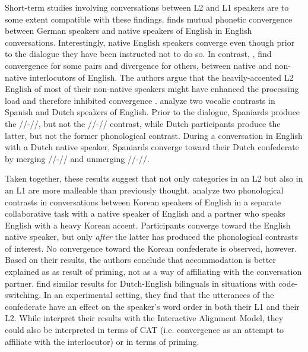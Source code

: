 \documentclass[output=paper,
modfonts
]{langscibook}
\begin{document}
Short-term studies involving conversations between L2 and L1 speakers are to some extent compatible with these findings. \cite{lewandowski_talent_2012} finds mutual phonetic convergence between German speakers and native speakers of English in English conversations. Interestingly, native English speakers converge even though prior to the dialogue they have been instructed not to do so.
In contrast, \cite{kim_phonetic_2011}, find convergence for some pairs and divergence for others, between native and non-native interlocutors of English. The authors argue that the heavily-accented L2 English of most of their non-native speakers might have enhanced the processing load and therefore inhibited convergence \citep{kim_phonetic_2011}.
% 
% 
\cite{berry_phonetic_2017} analyze two vocalic contrasts in Spanish and Dutch speakers of English. Prior to the dialogue, Spaniards produce the //-/\textipa{\ae}/, but not the //-// contrast, while Dutch participants produce the latter, but not the former phonological contrast. During a conversation in English with a Dutch native speaker, Spaniards converge toward their Dutch confederate by merging //-/\textipa{\ae}/ and unmerging //-//.

Taken together, these results suggest that not only categories in an L2 but also in an L1 are more malleable than previously thought. \cite{hwang_phonetic_2015} analyze two phonological contrasts in conversations between Korean speakers of English in a separate collaborative task with a native speaker of English and a partner who speaks English with a heavy Korean accent. Participants converge toward the English native speaker, but only \textit{after} the latter has produced the phonological contrasts of interest. No convergence toward the Korean confederate is observed, however. Based on their results, the authors conclude that accommodation is better explained as as result of priming, not as a way of affiliating with the conversation partner. \cite{kootstra_syntactic_2010} find similar results for Dutch-English bilinguals in situations with code-switching. In an experimental setting, they find that the utterances of the confederate have an effect on the speaker's word order in both their L1 and their L2. While \citeauthor{kootstra_syntactic_2010} interpret their results with the Interactive Alignment Model, they could also be interpreted in terms of CAT (i.e. convergence as an attempt to affiliate with the interlocutor) or in terms of priming.
% 
% 
\end{document}

